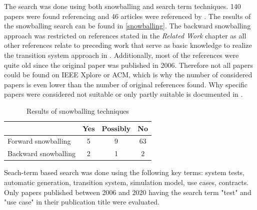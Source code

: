The search was done using both snowballing and search term techniques. 140 papers were found referencing \cite{ClementineNebut2006} and 46 articles were referenced by \cite{ClementineNebut2006}. The results of the snowballing search can be found in \autoref{snowballing}. The backward snowballing approach was restricted on references stated in the \textit{Related Work} chapter as all other references relate to preceding work that serve as basic knowledge to realize the transition system approach in \cite{ClementineNebut2006}. Additionally, most of the references were quite old since the original paper was published in 2006. Therefore not all papers could be found on IEEE Xplore or ACM, which is why the number of considered papers is even lower than the number of original references found. Why specific papers were considered not suitable or only partly suitable is documented in \cite{FelixHausberger2020}.

\begin{small}
	\begin{longtable}{l|c|c|c}
		\caption{Results of snowballing techniques}
		\label{snowballing}	
		\\    %
		\hline
		 & \textbf{Yes} & \textbf{Possibly} & \textbf{No} \\
		\hline	
		Forward snowballing & 5 & 9 & 63 \\
		\hline
		Backward snowballing & 2 & 1 & 2 \\
		\hline
	\end{longtable}
\end{small}


Seach-term based search was done using the following key terms: system tests, automatic generation, transition system, simulation model, use cases, contracts. Only papers published between 2006 and 2020 having the search term "test" and "use case" in their publication title were evaluated. 

\newpage


